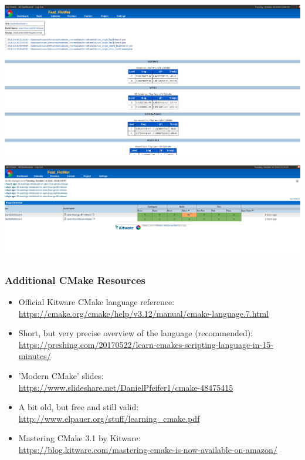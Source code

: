 \begin{frame}[plain]
  \begin{center}
    \includegraphics[width=\textwidth]{img/CDASH1.png}
  \end{center}
\end{frame}

\begin{frame}[plain]
  \begin{center}
    \includegraphics[width=\textwidth]{img/CDASH2.png}
  \end{center}
\end{frame}

\begin{frame}[squeeze]

  \frametitle{Additional CMake Resources}

  \begin{itemize}
      \item Official Kitware CMake language reference:\\
        \url{https://cmake.org/cmake/help/v3.12/manual/cmake-language.7.html}
      \item Short, but very precise overview of the language (recommended):\\
        \url{https://preshing.com/20170522/learn-cmakes-scripting-language-in-15-minutes/}
      \item 'Modern CMake' slides:\\
        \url{https://www.slideshare.net/DanielPfeifer1/cmake-48475415}
      \item A bit old, but free and still valid:\\
        \url{http://www.elpauer.org/stuff/learning_cmake.pdf}
      \item Mastering CMake 3.1 by Kitware:\\
        \url{https://blog.kitware.com/mastering-cmake-is-now-available-on-amazon/}
  \end{itemize}

\end{frame}

